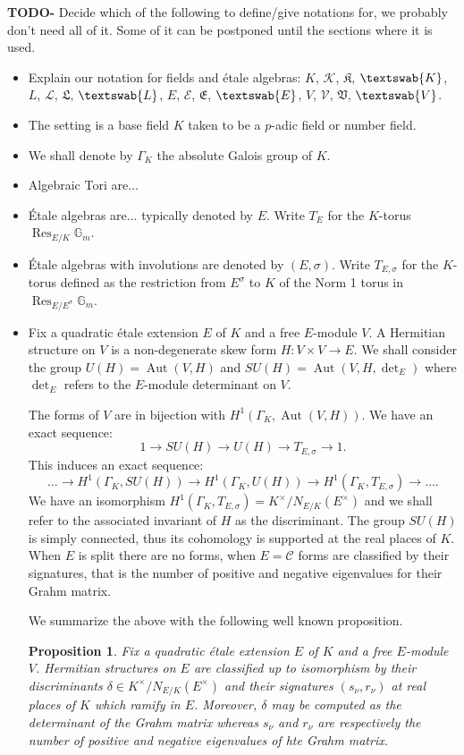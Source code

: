 \documentclass{article}
\theoremstyle{plain}
\newtheorem{proposition}[theorem]{Proposition}
\theoremstyle{definition}
\DeclareMathOperator{\Aut}{Aut}
\DeclareMathOperator{\Res}{Res}
\newcommand{\C}{\mathcal{C}}
\newcommand{\Gm}{\mathbb{G}_m}
\newcommand{\GalKbK}{\Gamma_K}
\newcommand{\TODO}[1]{\textbf{TODO-#1}}
\newcommand{\aK}{K}
\newcommand{\gK}{\mathcal{K}}
\newcommand{\lK}{\mathfrak{K}}
\newcommand{\fK}{\textswab{K}}
\newcommand{\aL}{L}
\newcommand{\gL}{\mathcal{L}}
\newcommand{\lL}{\mathfrak{L}}
\newcommand{\fL}{\textswab{L}}
\newcommand{\aE}{E}
\newcommand{\gE}{\mathcal{E}}
\newcommand{\lE}{\mathfrak{E}}
\newcommand{\fE}{\textswab{E}}
\newcommand{\aV}{V}
\newcommand{\gV}{\mathcal{V}}
\newcommand{\lV}{\mathfrak{V}}
\newcommand{\fV}{\textswab{V}}
\begin{document}
\TODO{} Decide which of the following to define/give notations for, we probably don't need all of it. Some of it can be postponed until the sections where it is used.
\begin{itemize}
\item Explain our notation for fields and \'etale algebras: $\aK$, $\gK$, $\lK$, $\fK$, $\aL$, $\gL$, $\lL$, $\fL$, $\aE$, $\gE$, $\lE$, $\fE$, $\aV$, $\gV$, $\lV$, $\fV$.
\item The setting is a base field $K$ taken to be a $p$-adic field or number field.
\item We shall denote by $\GalKbK$ the absolute Galois group of $K$.
\item Algebraic Tori are... 
\item \'Etale algebras are... typically denoted by $E$.  Write $T_E$ for the $K$-torus $\Res_{E/K} \Gm$.
\item \'Etale algebras with involutions are denoted by $(E, \sigma)$.  Write $T_{E, \sigma}$ for the $K$-torus defined as the restriction from $E^\sigma$ to $K$ of the Norm 1 torus in $\Res_{E/E^\sigma} \Gm$.
\item 

Fix a quadratic \'etale extension $E$ of $K$ and a free $E$-module $V$.
A Hermitian structure on $V$ is a non-degenerate skew form $H : V\times V \rightarrow E$.
We shall consider the group $U(H) = \Aut(V,H)$ and $SU(H) = \Aut(V,H,\det_E)$ where $\det_E$ refers to the $E$-module determinant on $V$.

The forms of $V$ are in bijection with $H^1(\GalKbK, \Aut(V,H))$.
We have an exact sequence:
\[ 1 \rightarrow SU(H) \rightarrow U(H) \rightarrow T_{E,\sigma} \rightarrow 1. \]
This induces an exact sequence:
\[ \ldots \rightarrow H^1(\GalKbK,SU(H))  \rightarrow H^1(\GalKbK,U(H))  \rightarrow H^1(\GalKbK,T_{E,\sigma}) \rightarrow \ldots. \]
We have an isomorphism $H^1(\GalKbK,T_{E,\sigma}) = K^\times/N_{E/K}(E^\times)$ and we shall refer to the associated invariant of $H$ as the discriminant.
The group $SU(H)$ is simply connected, thus its cohomology is supported at the real places of $K$.
When $E$ is split there are no forms, when $E=\C$ forms are classified by their signatures, that is the number of positive and negative eigenvalues for their Grahm matrix.

We summarize the above with the following well known proposition.
\begin{proposition}
Fix a quadratic \'etale extension $E$ of $K$ and a free $E$-module $V$.
Hermitian structures on $E$ are classified up to isomorphism by their discriminants $\delta\in K^\times/N_{E/K}(E^\times)$ and their signatures $(s_\nu,r_\nu)$ at real places of $K$ which ramify in $E$.
Moreover, $\delta$ may be computed as the determinant of the Grahm matrix whereas $s_\nu$ and $r_\nu$ are respectively the number of positive and negative eigenvalues of hte Grahm matrix.
\end{proposition}


\end{itemize}
\end{document}
